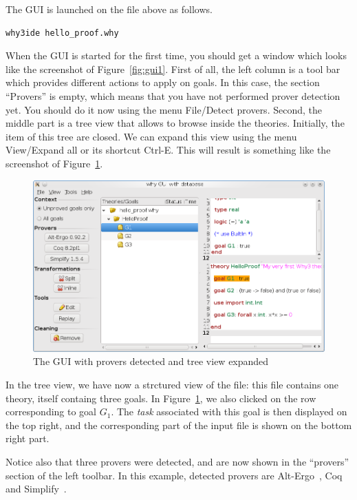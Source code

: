 The GUI is launched on the file above as follows.
\begin{verbatim}
why3ide hello_proof.why
\end{verbatim}
When the GUI is started for the first time, you should get a window
which looks like the screenshot of Figure~\ref{fig:gui1}. First of
all, the left column is a tool bar which provides different actions to
apply on goals. In this case, the section ``Provers'' is empty, which
means that you have not performed prover detection yet. You should do it
now using the menu \textsf{File/Detect provers}. Second, the middle
part is a tree view that allows to browse inside the
theories. Initially, the item of this tree are closed. We can
expand this view using the menu \textsf{View/Expand all} or its
shortcut \textsf{Ctrl-E}. This will result is something like the
screenshot of Figure~\ref{fig:gui2}.

\begin{figure}[tbp]
  \includegraphics[width=\textwidth]{gui2.png}
  \caption{The GUI with provers detected and tree view expanded}
  \label{fig:gui2}
\end{figure}

In the tree view, we have now a strctured view of the file: this file
contains one theory, itself containg three goals. In
Figure~\ref{fig:gui2}, we also clicked on the row corresponding to
goal $G_1$. The \emph{task} associated with this goal is then
displayed on the top right, and the corresponding part of the input
file is shown on the bottom right part.

Notice also that three provers were detected, and are now shown
in the ``provers'' section of the left toolbar. In this example,
detected provers are Alt-Ergo~\cite{ergo}, Coq~\cite{CoqArt} and
Simplify~\cite{simplify05}.

